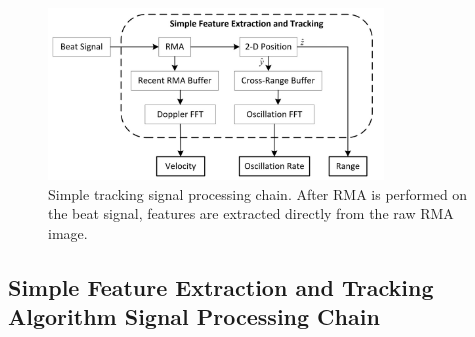 \documentclass[10pt,journal,final]{IEEEtran}
\begin{document}
\begin{figure}[h]
	\centering
	\includegraphics[width=3.5in]{simple_RMI.jpg}
	\caption{Simple tracking signal processing chain. After RMA is performed on the beat signal, features are extracted directly from the raw RMA image.}
	\label{fig:simple_signal_chain}
\end{figure}

\subsection{Simple Feature Extraction and Tracking Algorithm Signal Processing Chain}
\label{subsec:simple_tracking_implementation}


\end{document}

